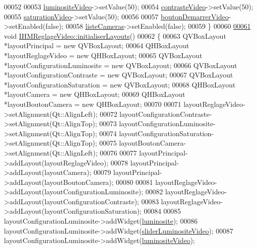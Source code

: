 \begin{DoxyCode}
00052 
00053     \hyperlink{class_i_h_m_reglage_video_a9109c0801d582917e78e57c350510ea7}{luminositeVideo}->setValue(50);
00054     \hyperlink{class_i_h_m_reglage_video_a617e9dbd5a92c35e7e351228354deb63}{contrasteVideo}->setValue(50);
00055     \hyperlink{class_i_h_m_reglage_video_a058bd2a65aefa5f95ff73851f156064c}{saturationVideo}->setValue(50);
00056 
00057     \hyperlink{class_i_h_m_reglage_video_a98d33390551ab92165f192be44f6361d}{boutonDemarrerVideo}->setEnabled(\textcolor{keyword}{false});
00058     \hyperlink{class_i_h_m_reglage_video_a38a35548ddd0e5750917305ac6f32142}{listeCameras}->setEnabled(\textcolor{keyword}{false});
00059 \}
00060 
\hyperlink{class_i_h_m_reglage_video_a6efcf5e8c7dfd272ecb1398985f7332a}{00061} \textcolor{keywordtype}{void} \hyperlink{class_i_h_m_reglage_video_a6efcf5e8c7dfd272ecb1398985f7332a}{IHMReglageVideo::initialiserLayouts}()
00062 \{
00063     QVBoxLayout *layoutPrincipal = \textcolor{keyword}{new} QVBoxLayout;
00064     QHBoxLayout *layoutReglageVideo = \textcolor{keyword}{new} QHBoxLayout;
00065     QVBoxLayout *layoutConfigurationLuminosite = \textcolor{keyword}{new} QVBoxLayout;
00066     QVBoxLayout *layoutConfigurationContraste = \textcolor{keyword}{new} QVBoxLayout;
00067     QVBoxLayout *layoutConfigurationSaturation = \textcolor{keyword}{new} QVBoxLayout;
00068     QHBoxLayout *layoutCamera = \textcolor{keyword}{new} QHBoxLayout;
00069     QHBoxLayout *layoutBoutonCamera = \textcolor{keyword}{new} QHBoxLayout;
00070 
00071     layoutReglageVideo->setAlignment(Qt::AlignLeft);
00072     layoutConfigurationContraste->setAlignment(Qt::AlignTop);
00073     layoutConfigurationLuminosite->setAlignment(Qt::AlignTop);
00074     layoutConfigurationSaturation->setAlignment(Qt::AlignTop);
00075     layoutBoutonCamera->setAlignment(Qt::AlignLeft);
00076 
00077     layoutPrincipal->addLayout(layoutReglageVideo);
00078     layoutPrincipal->addLayout(layoutCamera);
00079     layoutPrincipal->addLayout(layoutBoutonCamera);
00080 
00081     layoutReglageVideo->addLayout(layoutConfigurationLuminosite);
00082     layoutReglageVideo->addLayout(layoutConfigurationContraste);
00083     layoutReglageVideo->addLayout(layoutConfigurationSaturation);
00084 
00085     layoutConfigurationLuminosite->addWidget(\hyperlink{class_i_h_m_reglage_video_a16b65877af48863d0752e226371952ab}{luminosite});
00086     layoutConfigurationLuminosite->addWidget(\hyperlink{class_i_h_m_reglage_video_a333b7f1b3239abd5823e0b0f2857716b}{sliderLuminositeVideo});
00087     layoutConfigurationLuminosite->addWidget(\hyperlink{class_i_h_m_reglage_video_a9109c0801d582917e78e57c350510ea7}{luminositeVideo});

\end{DoxyCode}
